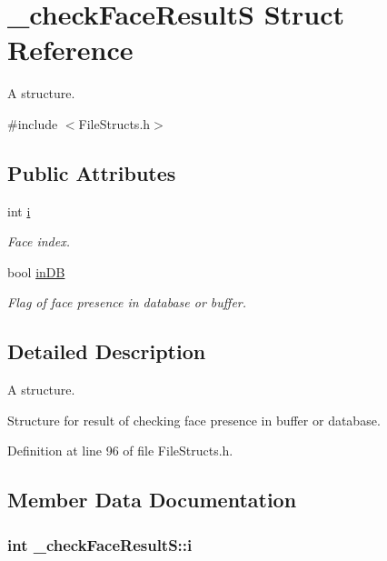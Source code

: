 \hypertarget{struct__check_face_result_s}{}\section{\+\_\+check\+Face\+ResultS Struct Reference}
\label{struct__check_face_result_s}


A structure.  




{\ttfamily \#include $<$File\+Structs.\+h$>$}

\subsection*{Public Attributes}
\begin{DoxyCompactItemize}
\item 
int \hyperlink{struct__check_face_result_s_a016b1da6b53d2a9fe2baf9a88b0699aa}{i}
\begin{DoxyCompactList}\small\item\em Face index. \end{DoxyCompactList}\item 
bool \hyperlink{struct__check_face_result_s_aa7353d6109af6ce0a9b2c8c07e09a48b}{in\+DB}
\begin{DoxyCompactList}\small\item\em Flag of face presence in database or buffer. \end{DoxyCompactList}\end{DoxyCompactItemize}


\subsection{Detailed Description}
A structure. 

Structure for result of checking face presence in buffer or database. 

Definition at line 96 of file File\+Structs.\+h.



\subsection{Member Data Documentation}
\subsubsection[{\texorpdfstring{i}{i}}]{\setlength{\rightskip}{0pt plus 5cm}int \+\_\+check\+Face\+Result\+S\+::i}\hypertarget{struct__check_face_result_s_a016b1da6b53d2a9fe2baf9a88b0699aa}{}\label{struct__check_face_result_s_a016b1da6b53d2a9fe2baf9a88b0699aa}


